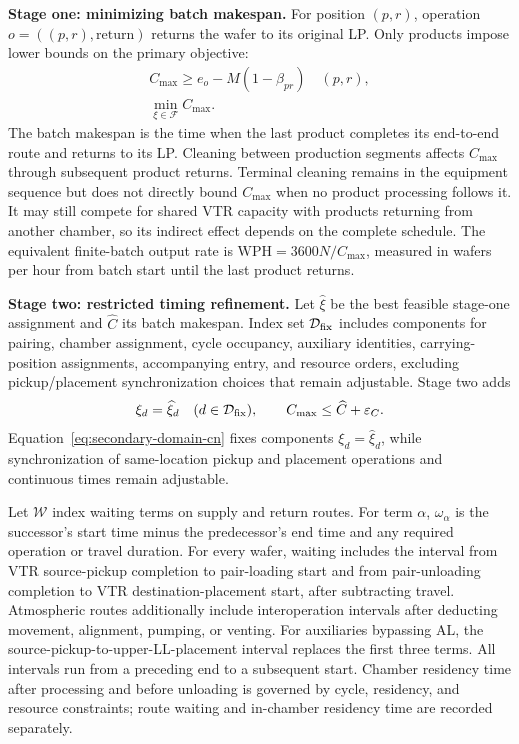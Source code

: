 \documentclass[final,5p,times,twocolumn]{elsarticle}
\begin{document}
\noindent\textbf{Stage one: minimizing batch makespan.}
For position $(p,r)$, operation $o=((p,r),\mathrm{return})$ returns the wafer to its original LP. Only products impose lower bounds on the primary objective:
\begin{equation}
\begin{gathered}
C_{\max}\ge e_o-M(1-\beta_{pr})\quad(p,r),\\
\min_{\xi\in\mathcal F}C_{\max}.
\end{gathered}
\label{eq:primary-objective-cn}
\end{equation}
The batch makespan is the time when the last product completes its end-to-end route and returns to its LP. Cleaning between production segments affects $C_{\max}$ through subsequent product returns. Terminal cleaning remains in the equipment sequence but does not directly bound $C_{\max}$ when no product processing follows it. It may still compete for shared VTR capacity with products returning from another chamber, so its indirect effect depends on the complete schedule. The equivalent finite-batch output rate is $\mathrm{WPH}=3600N/C_{\max}$, measured in wafers per hour from batch start until the last product returns.

\noindent\textbf{Stage two: restricted timing refinement.}
Let $\widehat\xi$ be the best feasible stage-one assignment and $\widehat C$ its batch makespan. Index set $\mathcal D_{\rm fix}$ includes components for pairing, chamber assignment, cycle occupancy, auxiliary identities, carrying-position assignments, accompanying entry, and resource orders, excluding pickup/placement synchronization choices that remain adjustable. Stage two adds
\begin{equation}
\begin{gathered}
\xi_d=\widehat\xi_d\quad(d\in\mathcal D_{\rm fix}),\qquad
C_{\max}\le\widehat C+\varepsilon_C.
\end{gathered}
\label{eq:secondary-domain-cn}
\end{equation}
Equation~\eqref{eq:secondary-domain-cn} fixes components $\xi_d=\widehat\xi_d$, while synchronization of same-location pickup and placement operations and continuous times remain adjustable.

Let $\mathcal W$ index waiting terms on supply and return routes. For term $\alpha$, $\omega_\alpha$ is the successor's start time minus the predecessor's end time and any required operation or travel duration. For every wafer, waiting includes the interval from VTR source-pickup completion to pair-loading start and from pair-unloading completion to VTR destination-placement start, after subtracting travel. Atmospheric routes additionally include interoperation intervals after deducting movement, alignment, pumping, or venting. For auxiliaries bypassing AL, the source-pickup-to-upper-LL-placement interval replaces the first three terms. All intervals run from a preceding end to a subsequent start. Chamber residency time after processing and before unloading is governed by cycle, residency, and resource constraints; route waiting and in-chamber residency time are recorded separately.
\end{document}

